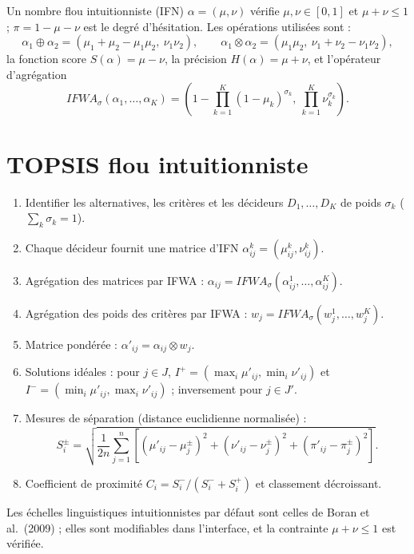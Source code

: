 \documentclass[11pt,a4paper]{report}
\theoremstyle{definition}
\theoremstyle{remark}
\begin{document}
Un nombre flou intuitionniste (IFN) $\alpha=(\mu,\nu)$ vérifie $\mu,\nu\in[0,1]$ et $\mu+\nu\le 1$ ;
$\pi=1-\mu-\nu$ est le degré d'hésitation. Les opérations utilisées sont :
\begin{equation}
  \alpha_1\oplus\alpha_2=(\mu_1+\mu_2-\mu_1\mu_2,\ \nu_1\nu_2),\qquad
  \alpha_1\otimes\alpha_2=(\mu_1\mu_2,\ \nu_1+\nu_2-\nu_1\nu_2),
\end{equation}
la fonction score $S(\alpha)=\mu-\nu$, la précision $H(\alpha)=\mu+\nu$, et l'opérateur d'agrégation
\begin{equation}
  IFWA_\sigma(\alpha_1,\dots,\alpha_K)=\left(1-\prod_{k=1}^K(1-\mu_k)^{\sigma_k},\ \prod_{k=1}^K\nu_k^{\sigma_k}\right).
\end{equation}

\section{TOPSIS flou intuitionniste}

\begin{enumerate}
  \item Identifier les alternatives, les critères et les décideurs $D_1,\dots,D_K$ de poids
        $\sigma_k$ ($\sum_k\sigma_k=1$).
  \item Chaque décideur fournit une matrice d'IFN $\alpha_{ij}^k=(\mu_{ij}^k,\nu_{ij}^k)$.
  \item Agrégation des matrices par IFWA : $\alpha_{ij}=IFWA_\sigma(\alpha_{ij}^1,\dots,\alpha_{ij}^K)$.
  \item Agrégation des poids des critères par IFWA : $w_j=IFWA_\sigma(w_j^1,\dots,w_j^K)$.
  \item Matrice pondérée : $\alpha'_{ij}=\alpha_{ij}\otimes w_j$.
  \item Solutions idéales : pour $j\in J$, $I^+=(\max_i\mu'_{ij},\min_i\nu'_{ij})$ et
        $I^-=(\min_i\mu'_{ij},\max_i\nu'_{ij})$ ; inversement pour $j\in J'$.
  \item Mesures de séparation (distance euclidienne normalisée) :
  \begin{equation}
    S_i^{\pm}=\sqrt{\frac{1}{2n}\sum_{j=1}^n\left[(\mu'_{ij}-\mu_j^{\pm})^2+(\nu'_{ij}-\nu_j^{\pm})^2+(\pi'_{ij}-\pi_j^{\pm})^2\right]}.
  \end{equation}
  \item Coefficient de proximité $C_i=S_i^-/(S_i^-+S_i^+)$ et classement décroissant.
\end{enumerate}
Les échelles linguistiques intuitionnistes par défaut sont celles de Boran et al.\ (2009) ; elles sont
modifiables dans l'interface, et la contrainte $\mu+\nu\le 1$ est vérifiée.
\end{document}
